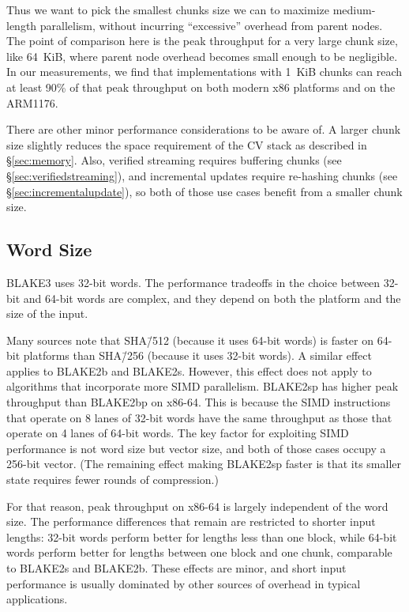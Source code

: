 \documentclass[11pt,notitlepage,a4paper]{article}
\begin{document}
Thus we want to pick the smallest chunks size we can to maximize medium-length
parallelism, without incurring ``excessive'' overhead from parent nodes. The
point of comparison here is the peak throughput for a very large chunk size,
like 64~KiB, where parent node overhead becomes small enough to be negligible.
In our measurements, we find that implementations with 1~KiB chunks can reach
at least 90\% of that peak throughput on both modern x86 platforms and on the
ARM1176.

There are other minor performance considerations to be aware of. A larger chunk
size slightly reduces the space requirement of the CV stack as described in
\S\ref{sec:memory}. Also, verified streaming requires buffering chunks (see
\S\ref{sec:verifiedstreaming}), and incremental updates require re-hashing
chunks (see \S\ref{sec:incrementalupdate}), so both of those use cases benefit
from a smaller chunk size.

\subsection{Word Size}\label{sec:wordsize}

BLAKE3 uses 32-bit words. The performance tradeoffs in the choice between
32-bit and 64-bit words are complex, and they depend on both the platform and
the size of the input.

Many sources note that SHA\=/512 (because it uses 64-bit words) is faster on
64-bit platforms than SHA\=/256 (because it uses 32-bit words). A similar effect
applies to BLAKE2b and BLAKE2s. However, this effect does not apply to
algorithms that incorporate more SIMD parallelism. BLAKE2sp has higher peak
throughput than BLAKE2bp on x86-64. This is because the SIMD instructions that
operate on 8 lanes of 32-bit words have the same throughput as those that
operate on 4 lanes of 64-bit words. The key factor for exploiting SIMD
performance is not word size but vector size, and both of those cases occupy a
256-bit vector. (The remaining effect making BLAKE2sp faster is that its
smaller state requires fewer rounds of compression.)

For that reason, peak throughput on x86-64 is largely independent of the word
size. The performance differences that remain are restricted to shorter input
lengths: 32-bit words perform better for lengths less than one block, while
64-bit words perform better for lengths between one block and one chunk,
comparable to BLAKE2s and BLAKE2b. These effects are minor, and short input
performance is usually dominated by other sources of overhead in typical
applications.
\end{document}
